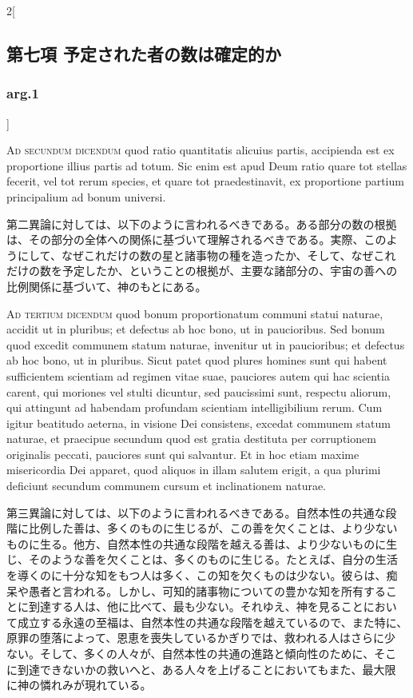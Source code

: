 \documentclass[paper=a4paper,fontsize=10pt,jafontsize=9pt,titlepage]{jlreq}
\begin{document}
\begin{paracol}{2}[\subsection{第七項 予定された者の数は確定的か}\subsubsection{arg.1}]
\switchcolumn*[\subsubsection{ad.2}]


{\scshape Ad secundum dicendum} quod ratio quantitatis
alicuius partis, accipienda est ex proportione illius partis ad
totum. Sic enim est apud Deum ratio quare tot stellas fecerit, vel tot
rerum species, et quare tot praedestinavit, ex proportione partium
principalium ad bonum universi.


\switchcolumn


第二異論に対しては、以下のように言われるべきである。ある部分の数の根拠
は、その部分の全体への関係に基づいて理解されるべきである。実際、このよ
うにして、なぜこれだけの数の星と諸事物の種を造ったか、そして、なぜこれ
だけの数を予定したか、ということの根拠が、主要な諸部分の、宇宙の善への
比例関係に基づいて、神のもとにある。


\switchcolumn*[\subsubsection{ad.3}]


{\scshape Ad tertium dicendum} quod bonum proportionatum
communi statui naturae, accidit ut in pluribus; et defectus ab hoc bono,
ut in paucioribus. Sed bonum quod excedit communem statum naturae,
invenitur ut in paucioribus; et defectus ab hoc bono, ut in
pluribus. Sicut patet quod plures homines sunt qui habent sufficientem
scientiam ad regimen vitae suae, pauciores autem qui hac scientia
carent, qui moriones vel stulti dicuntur, sed paucissimi sunt, respectu
aliorum, qui attingunt ad habendam profundam scientiam intelligibilium
rerum. Cum igitur beatitudo aeterna, in visione Dei consistens, excedat
communem statum naturae, et praecipue secundum quod est gratia destituta
per corruptionem originalis peccati, pauciores sunt qui salvantur. Et in
hoc etiam maxime misericordia Dei apparet, quod aliquos in illam salutem
erigit, a qua plurimi deficiunt secundum communem cursum et
inclinationem naturae.


\switchcolumn


第三異論に対しては、以下のように言われるべきである。自然本性の共通な段
階に比例した善は、多くのものに生じるが、この善を欠くことは、より少ない
ものに生る。他方、自然本性の共通な段階を越える善は、より少ないものに生
じ、そのような善を欠くことは、多くのものに生じる。たとえば、自分の生活
を導くのに十分な知をもつ人は多く、この知を欠くものは少ない。彼らは、痴
呆や愚者と言われる。しかし、可知的諸事物についての豊かな知を所有するこ
とに到達する人は、他に比べて、最も少ない。それゆえ、神を見ることにおい
て成立する永遠の至福は、自然本性の共通な段階を越えているので、また特に、
原罪の堕落によって、恩恵を喪失しているかぎりでは、救われる人はさらに少
ない。そして、多くの人々が、自然本性の共通の進路と傾向性のために、そこ
に到達できないかの救いへと、ある人々を上げることにおいてもまた、最大限
に神の憐れみが現れている。


\switchcolumn*



\end{paracol}
\end{document}
